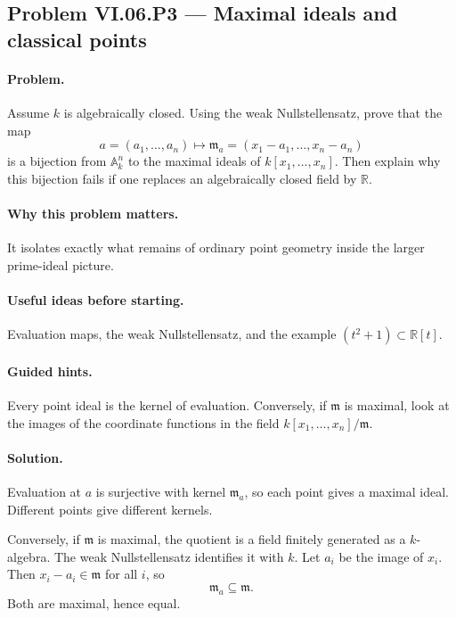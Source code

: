 \subsection*{Problem VI.06.P3 --- Maximal ideals and classical points}
\label{prob:vi-06-p3}

\paragraph{Problem.}
Assume \(k\) is algebraically closed.  Using the weak Nullstellensatz, prove that the map
\[
a=(a_1,\dots,a_n)
\longmapsto
\mathfrak m_a=(x_1-a_1,\dots,x_n-a_n)
\]
is a bijection from \(\mathbb A_k^n\) to the maximal ideals of
\(k[x_1,\dots,x_n]\).  Then explain why this bijection fails if one replaces an
algebraically closed field by \(\mathbb R\).

\ifdefined\FullProblemDossiers
\paragraph{Why this problem matters.}
It isolates exactly what remains of ordinary point geometry inside the larger prime-ideal
picture.

\paragraph{Useful ideas before starting.}
Evaluation maps, the weak Nullstellensatz, and the example \((t^2+1)\subset\mathbb R[t]\).

\paragraph{Guided hints.}
Every point ideal is the kernel of evaluation.  Conversely, if \(\mathfrak m\) is maximal,
look at the images of the coordinate functions in the field
\(k[x_1,\dots,x_n]/\mathfrak m\).

\paragraph{Solution.}
Evaluation at \(a\) is surjective with kernel \(\mathfrak m_a\), so each point gives a
maximal ideal.  Different points give different kernels.

Conversely, if \(\mathfrak m\) is maximal, the quotient is a field finitely generated as a
\(k\)-algebra.  The weak Nullstellensatz identifies it with \(k\).  Let \(a_i\) be the image
of \(x_i\).  Then \(x_i-a_i\in\mathfrak m\) for all \(i\), so
\[
\mathfrak m_a\subseteq\mathfrak m.
\]
Both are maximal, hence equal.

